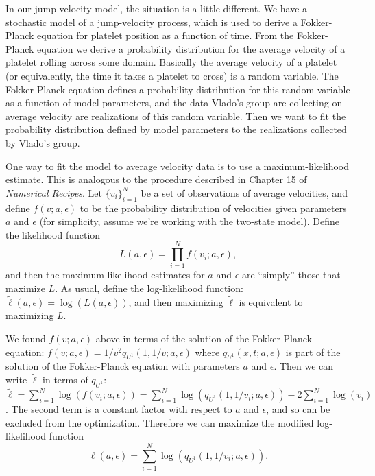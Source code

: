 \documentclass{article}
\begin{document}
In our jump-velocity model, the situation is a little different. We
have a stochastic model of a jump-velocity process, which is used to
derive a Fokker-Planck equation for platelet position as a function of
time. From the Fokker-Planck equation we derive a probability
distribution for the average velocity of a platelet rolling across
some domain. Basically the average velocity of a platelet (or
equivalently, the time it takes a platelet to cross) is a random
variable. The Fokker-Planck equation defines a probability
distribution for this random variable as a function of model
parameters, and the data Vlado's group are collecting on average
velocity are realizations of this random variable. Then we want to fit
the probability distribution defined by model parameters to the
realizations collected by Vlado's group.

One way to fit the model to average velocity data is to use a
maximum-likelihood estimate. This is analogous to the procedure
described in Chapter 15 of \textit{Numerical Recipes}. Let
$\{v_i\}_{i=1}^N$ be a set of observations of average velocities, and
define $f(v;a, \epsilon)$ to be the probability distribution of
velocities given parameters $a$ and $\epsilon$ (for simplicity, assume
we're working with the two-state model). Define the likelihood
function
\begin{equation}
  \label{eq:likelihood}
  L(a, \epsilon) = \prod_{i=1}^N f(v_i; a, \epsilon),
\end{equation}
and then the maximum likelihood estimates for $a$ and $\epsilon$ are
``simply'' those that maximize $L$. As usual, define the
log-likelihood function: $\tilde{\ell}(a, \epsilon) = \log(L(a, \epsilon))$,
and then maximizing $\tilde{\ell}$ is equivalent to maximizing $L$.

We found $f(v; a, \epsilon)$ above in terms of the solution of the
Fokker-Planck equation: $f(v; a, \epsilon) = 1/v^2 q_{U^1}(1, 1/v; a,
\epsilon)$ where $q_{U^1}(x, t; a, \epsilon)$ is part of the solution
of the Fokker-Planck equation with parameters $a$ and $\epsilon$. Then
we can write $\tilde{\ell}$ in terms of $q_{U^1}$:
$\tilde{\ell} = \sum_{i=1}^N \log(f(v_i; a, \epsilon)) = \sum_{i=1}^N
\log(q_{U^1}(1, 1/v_i; a, \epsilon)) - 2\sum_{i=1}^N \log(v_i)$. The
second term is a constant factor with respect to $a$ and $\epsilon$,
and so can be excluded from the optimization. Therefore we can
maximize the modified log-likelihood function
\begin{equation}
  \label{eq:mod-log-like}
  \ell(a, \epsilon) = \sum_{i=1}^N \log(q_{U^1}(1, 1/v_i; a, \epsilon)).
\end{equation}
\end{document}
